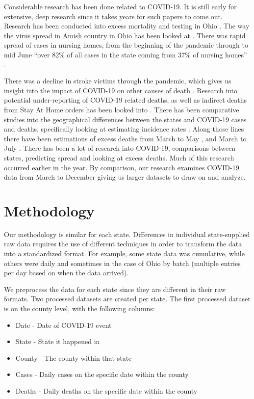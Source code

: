 \documentclass[conference]{IEEEtran}
\begin{document}
Considerable research has been done related to COVID-19. It is still early for extensive, deep research since it takes years for such papers to come out.
Research has been conducted into excess mortality and testing in Ohio \cite{quast_excess_2020}.
The way the virus spread in Amish country in Ohio has been looked at \cite{ali_covid-19_2020}.
There was rapid spread of cases in nursing homes, from the beginning of the pandemic through to mid June ``over 82\% of all cases in the state coming from 37\% of nursing homes'' \cite{bowblis_prevalence_2020}.

There was a decline in stroke victims through the pandemic, which gives us insight into the impact of COVID-19 on other causes of death \cite{uchino_decline_2020}.
Research into potential under-reporting of COVID-19 related deaths, as well as indirect deaths from Stay At Home orders has been looked into \cite{woolf_excess_2020}.
There has been comparative studies into the geographical differences between the states and COVID-19 cases and deaths, specifically looking at estimating incidence rates \cite{cdc_covid-19_response_team_geographic_2020}. 
Along those lines there have been estimations of excess deaths from March to May \cite{weinberger_estimation_2020}, and March to July \cite{woolf_excess_2020-1}.
There has been a lot of research into COVID-19, comparisons between states, predicting spread and looking at excess deaths. 
Much of this research occurred earlier in the year. By comparison, our research examines COVID-19 data from March to December giving us larger datasets to draw on and analyze.

\section{Methodology}

Our methodology is similar for each state. Differences in individual state-supplied raw data requires the use of different techniques in order to transform the data into a standardized format.
For example, some state data was cumulative, while others were daily and sometimes in the case of Ohio by batch (multiple entries per day based on when the data arrived).

We preprocess the data for each state since they are different in their raw formats.
Two processed datasets are created per state.
The first processed dataset is on the county level, with the following columns:
\begin{itemize}
  \item Date - Date of COVID-19 event
  \item State - State it happened in
  \item County - The county within that state
  \item Cases - Daily cases on the specific date within the county
  \item Deaths - Daily deaths on the specific date within the county
\end{itemize}
\end{document}
